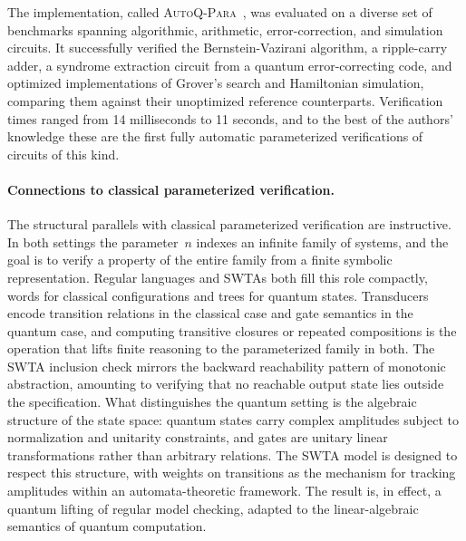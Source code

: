 The implementation, called \textsc{AutoQ-Para}~\cite{AutoQPara}, was evaluated
on a diverse set of benchmarks spanning algorithmic, arithmetic,
error-correction, and simulation circuits. It successfully verified the
Bernstein-Vazirani algorithm, a ripple-carry adder, a syndrome extraction
circuit from a quantum error-correcting code, and optimized implementations
of Grover's search and Hamiltonian simulation, comparing them against their
unoptimized reference counterparts. Verification times ranged from
14 milliseconds to 11 seconds, and to the best of the authors' knowledge
these are the first fully automatic parameterized verifications of circuits
of this kind.

\paragraph{Connections to classical parameterized verification.}
The structural parallels with classical parameterized verification are
instructive. In both settings the parameter~$n$ indexes an infinite family of
systems, and the goal is to verify a property of the entire family from a
finite symbolic representation. Regular languages and SWTAs both fill this
role compactly, words for classical configurations and trees for quantum states.
Transducers encode transition relations in the classical case and gate semantics
in the quantum case, and computing transitive closures or repeated compositions
is the operation that lifts finite reasoning to the parameterized family in
both. The SWTA inclusion check mirrors the backward reachability pattern of
monotonic abstraction, amounting to verifying that no reachable output state
lies outside the specification. What distinguishes the quantum setting is the
algebraic structure of the state space: quantum states carry complex amplitudes
subject to normalization and unitarity constraints, and gates are unitary linear
transformations rather than arbitrary relations. The SWTA model is designed to
respect this structure, with weights on transitions as the mechanism for
tracking amplitudes within an automata-theoretic framework. The result is, in
effect, a quantum lifting of regular model checking, adapted to the
linear-algebraic semantics of quantum computation.
